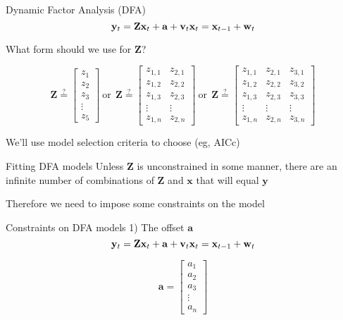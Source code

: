 \documentclass[
  ignorenonframetext,
]{beamer}
\begin{document}
\begin{frame}{Dynamic Factor Analysis (DFA)}
\protect\hypertarget{dynamic-factor-analysis-dfa-2}{}
\[
\mathbf{y}_t = \mathbf{Z} \mathbf{x}_t + \mathbf{a} + \mathbf{v}_t \\
\mathbf{x}_t = \mathbf{x}_{t-1} + \mathbf{w}_t
\]

What form should we use for \(\mathbf{Z}\)?

\[
\mathbf{Z} \stackrel{?}{=}
\begin{bmatrix}
 z_1 \\
 z_2 \\
 z_3 \\
 \vdots \\
 z_5
\end{bmatrix}
~\text{or}~~
\mathbf{Z} \stackrel{?}{=}
\begin{bmatrix}
 z_{1,1} & z_{2,1} \\
 z_{1,2} & z_{2,2} \\
 z_{1,3} & z_{2,3} \\
 \vdots & \vdots \\
 z_{1,n} & z_{2,n}
\end{bmatrix}
~\text{or}~~
\mathbf{Z} \stackrel{?}{=}
\begin{bmatrix}
 z_{1,1} & z_{2,1} & z_{3,1} \\
 z_{1,2} & z_{2,2} & z_{3,2} \\
 z_{1,3} & z_{2,3} & z_{3,3} \\
 \vdots & \vdots & \vdots \\
 z_{1,n} & z_{2,n} & z_{3,n}
\end{bmatrix}
\]

We'll use model selection criteria to choose (eg, AICc)
\end{frame}

\begin{frame}{Fitting DFA models}
\protect\hypertarget{fitting-dfa-models}{}
Unless \(\mathbf{Z}\) is unconstrained in some manner, there are an
infinite number of combinations of \(\mathbf{Z}\) and \(\mathbf{x}\)
that will equal \(\mathbf{y}\)

Therefore we need to impose some constraints on the model
\end{frame}

\begin{frame}{Constraints on DFA models \textbar{} 1) The offset
\(\mathbf{a}\)}
\protect\hypertarget{constraints-on-dfa-models-1-the-offset-mathbfa}{}
\[
\mathbf{y}_t = \mathbf{Z} \mathbf{x}_t + \mathbf{a} + \mathbf{v}_t \\
\mathbf{x}_t = \mathbf{x}_{t-1} + \mathbf{w}_t
\]

\[
\mathbf{a} =
\begin{bmatrix}
 a_1 \\
 a_2 \\
 a_3 \\
 \vdots \\
 a_n
\end{bmatrix}
\]
\end{frame}
\end{document}
